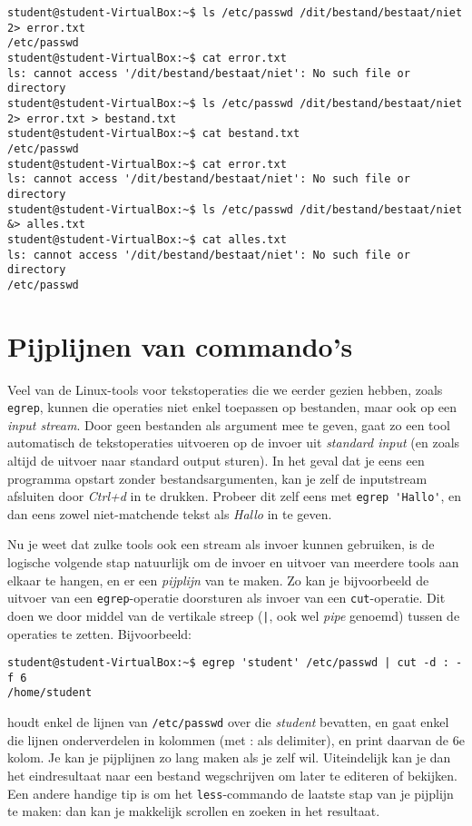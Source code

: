 \documentclass[a4paper,twoside,openany]{memoir}
\begin{document}
\begin{verbatim}
student@student-VirtualBox:~$ ls /etc/passwd /dit/bestand/bestaat/niet 2> error.txt
/etc/passwd
student@student-VirtualBox:~$ cat error.txt
ls: cannot access '/dit/bestand/bestaat/niet': No such file or directory
student@student-VirtualBox:~$ ls /etc/passwd /dit/bestand/bestaat/niet 2> error.txt > bestand.txt
student@student-VirtualBox:~$ cat bestand.txt
/etc/passwd
student@student-VirtualBox:~$ cat error.txt
ls: cannot access '/dit/bestand/bestaat/niet': No such file or directory
student@student-VirtualBox:~$ ls /etc/passwd /dit/bestand/bestaat/niet &> alles.txt
student@student-VirtualBox:~$ cat alles.txt
ls: cannot access '/dit/bestand/bestaat/niet': No such file or directory
/etc/passwd
\end{verbatim}

\chapter{Pijplijnen van commando's}

Veel van de Linux-tools voor tekstoperaties die we eerder gezien hebben, zoals
\verb!egrep!, kunnen die operaties niet enkel toepassen op bestanden, maar ook
op een \emph{input stream}. Door geen bestanden als argument mee te geven, gaat
zo een tool automatisch de tekstoperaties uitvoeren op de invoer uit
\emph{standard input} (en zoals altijd de uitvoer naar standard output sturen).
In het geval dat je eens een programma opstart zonder bestandsargumenten, kan je
zelf de inputstream afsluiten door \emph{Ctrl+d} in te drukken. Probeer dit zelf
eens met \verb!egrep 'Hallo'!, en dan eens zowel niet-matchende tekst als
\emph{Hallo} in te geven.

Nu je weet dat zulke tools ook een stream als invoer kunnen gebruiken, is de
logische volgende stap natuurlijk om de invoer en uitvoer van meerdere tools aan
elkaar te hangen, en er een \emph{pijplijn} van te maken. Zo kan je bijvoorbeeld
de uitvoer van een \verb!egrep!-operatie doorsturen als invoer van een
\verb!cut!-operatie. Dit doen we door middel van de vertikale streep (\verb!|!,
ook wel \emph{pipe} genoemd) tussen de operaties te zetten. Bijvoorbeeld:
\begin{verbatim}
student@student-VirtualBox:~$ egrep 'student' /etc/passwd | cut -d : -f 6
/home/student
\end{verbatim}

houdt enkel de lijnen van \verb!/etc/passwd! over die \emph{student} bevatten,
en gaat enkel die lijnen onderverdelen in kolommen (met : als delimiter), en
print daarvan de 6e kolom. Je kan je pijplijnen zo lang maken als je zelf wil.
Uiteindelijk kan je dan het eindresultaat naar een bestand wegschrijven om later
te editeren of bekijken. Een andere handige tip is om het \verb!less!-commando
de laatste stap van je pijplijn te maken: dan kan je makkelijk scrollen en
zoeken in het resultaat.
\end{document}
